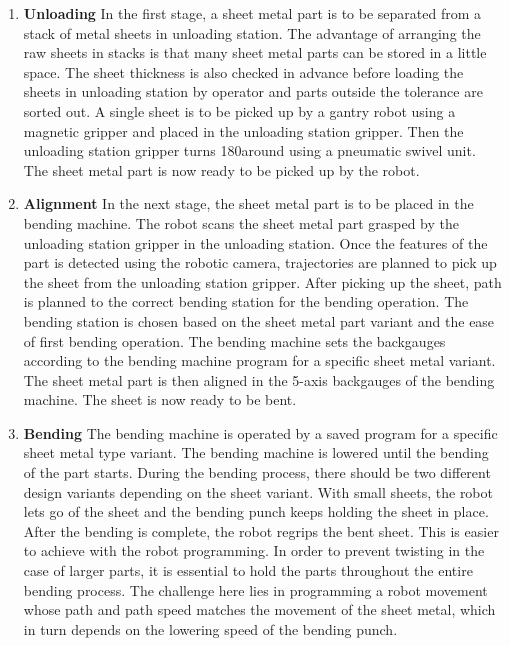 \begin{enumerate}
    \item \par{\textbf{Unloading}}
    \label{par:unloading}
    In the first stage, a sheet metal part is to be separated from a stack of metal sheets in unloading station. The advantage of
    arranging the raw sheets in stacks is that many sheet metal parts can be stored in a little space. The sheet thickness is
    also checked in advance before loading the sheets in unloading station by operator and parts outside the tolerance are sorted out. A single sheet is to be picked up by a gantry robot using a magnetic gripper and placed in the unloading station gripper. Then the unloading station gripper turns 180\textdegree around using a pneumatic swivel unit. The sheet metal part is now ready to be picked up by the robot.
    
    
    \item \par{\textbf{Alignment}}
    \label{par:alignment}
    In the next stage, the sheet metal part is to be placed in the bending machine. The robot scans the sheet metal part grasped by the unloading station gripper in the unloading station. Once the features of the part is detected using the robotic camera, trajectories are planned to pick up the sheet from the unloading station gripper. After picking up the sheet, path is planned to the correct bending station for the bending operation. The bending station is chosen based on the sheet metal part variant and the ease of first bending operation. The bending machine sets the backgauges according to the bending machine program for a specific sheet metal variant. The sheet metal part is then aligned in the 5-axis backgauges of the bending machine. The sheet is now ready to be bent. 
    
    \item \par{\textbf{Bending}}
    \label{par:bending}
    The bending machine is operated by a saved program for a specific sheet metal type variant. The bending machine is lowered until the bending of the part starts. During the bending process, there should be two different design variants depending on the sheet
    variant. With small sheets, the robot lets go of the sheet and the bending punch keeps holding the sheet in place. After the bending is complete, the robot regrips the bent sheet. This is easier to achieve with the robot programming. In order to prevent twisting in the case of larger parts, it is essential to hold the parts throughout the entire bending process. The challenge here lies in programming a robot movement
    whose path and path speed matches the movement of the sheet metal, which in turn depends on the
    lowering speed of the bending punch.
    

\end{enumerate}
